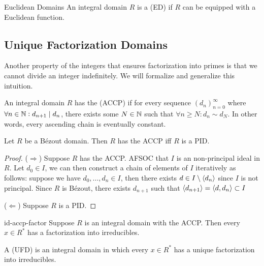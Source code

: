 \documentclass{styles/tufte}
\begin{document}
  \begin{definition}{Euclidean Domains}{}
    An integral domain $R$ is a  (ED) if $R$ can be equipped with a Euclidean function.
  \end{definition}


\subsection{Unique Factorization Domains}

  Another property of the integers that ensures factorization into primes is that we cannot divide an integer indefinitely. We will formalize and generalize this intuition.
  
  \begin{definition}{}{}
    An integral domain $R$ has the  (ACCP) if for every sequence $(d_n)_{n=0}^\infty$ where $\forall n \in \mathbb{N}: d_{n+1} \mid d_n$, there exists some $N \in \mathbb{N}$ such that $\forall n \geqslant N: d_n \sim d_N$. In other words, every ascending chain is eventually constant.
  \end{definition}
  
  \begin{proposition}{}{}
    Let $R$ be a B\'ezout domain. Then $R$ has the ACCP iff $R$ is a PID.
  \end{proposition}
  \begin{proof}
    ($\Rightarrow$) Suppose $R$ has the ACCP. AFSOC that $I$ is an non-principal ideal in $R$. Let $d_0 \in I$, we can then construct a chain of elements of $I$ iteratively as follows: suppose we have $d_0, \dots, d_n \in I$, then there exists $d \in I \setminus \langle d_n \rangle$ since $I$ is not principal. Since $R$ is B\'ezout, there exists $d_{n+1}$ such that $\langle d_{n+1} \rangle = \langle d, d_n \rangle \subset I$
    
    ($\Leftarrow$) Suppose $R$ is a PID.
  \end{proof}
  
  \begin{lemma}{}{id-accp-factor}
    Suppose $R$ is an integral domain with the ACCP. Then every $x \in R^*$ has a factorization into irreducibles.
  \end{lemma}
  
  \begin{definition}{}{}
    A  (UFD) is an integral domain in which every $x \in R^*$ has a unique factorization into irreducibles.
  \end{definition}
  
\end{document}
